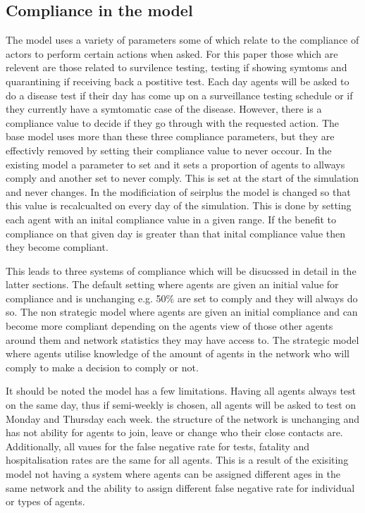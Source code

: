 \documentclass{article}
\begin{document}
\subsection{Compliance in the model}
The model uses a variety of parameters some of which relate to the compliance of actors to perform certain actions when asked. For this paper those which are relevent are those related to survilence testing, testing if showing symtoms and quarantining if receiving back a postitive test. Each day agents will be asked to do a disease test if their day has come up on a surveillance testing schedule or if they currently have a symtomatic case of the disease. However, there is a compliance value to decide if they go  through with the requested action. The base model uses more than these three compliance parameters, but they are effectivly removed by setting their compliance value to never occour. In the existing model a parameter to set and it sets a proportion of agents to allways comply and another set to never comply. This is set at the start of the simulation and never changes. In the modificiation of seirplus the model is changed so that this value is recalcualted on every day of the simulation. This is done by setting each agent with an inital compliance value in a given range. If the benefit to compliance on that given day is greater than that inital compliance value then they become compliant. \newline

This leads to three systems of compliance which will be disucssed in detail in the latter sections. The default setting where agents are given an initial value for compliance and is unchanging e.g. 50\% are set to comply and they will always do so. The non strategic model where agents are given an initial compliance and can become more compliant depending on the agents view of those other agents around them and network statistics they may have access to. The strategic model where agents utilise knowledge of the amount of agents in the network who will comply to make a decision to comply or not.\newline

It should be noted the model has a few limitations. Having all agents always test on the same day, thus if semi-weekly is chosen, all agents will be asked to test on Monday and Thursday each week. the structure of the network is unchanging and has not ability for agents to join, leave or change who their close contacts are. Additionally, all vaues for the false negative rate for tests, fatality and hospitalisation rates are the same for all agents. This is a result of the exisiting model not having a system where agents can be assigned different ages in the same network and the ability to assign different false negative rate for individual or types of agents.
\end{document}

